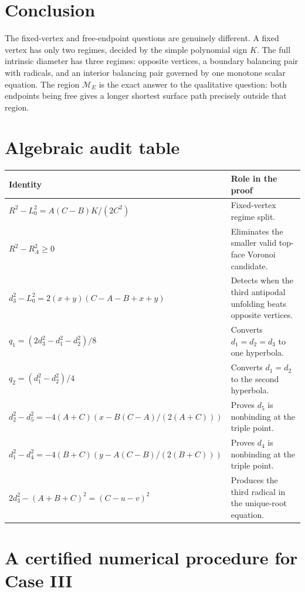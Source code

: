 \documentclass[11pt]{article}
\theoremstyle{definition}
\begin{document}
\section{Conclusion}

The fixed-vertex and free-endpoint questions are genuinely different.  A
fixed vertex has only two regimes, decided by the simple polynomial sign
$K$.  The full intrinsic diameter has three regimes: opposite vertices, a
boundary balancing pair with radicals, and an interior balancing pair governed
by one monotone scalar equation.  The region $\mathcal M_E$ is the exact
answer to the qualitative question: both endpoints being free gives a longer
shortest surface path precisely outside that region.

\appendix

\section{Algebraic audit table}

\begin{longtable}{>{\raggedright\arraybackslash}p{}
                  >{\raggedright\arraybackslash}p{}}
\toprule
Identity & Role in the proof\\
\midrule
\endhead
$R^2-L_0^2=A(C-B)K/(2C^2)$ & Fixed-vertex regime split.\\[2pt]
$R^2-R_A^2\ge0$ & Eliminates the smaller valid top-face Voronoi candidate.\\[2pt]
$d_3^2-L_0^2=2(x+y)(C-A-B+x+y)$ & Detects when the third antipodal unfolding beats opposite vertices.\\[2pt]
$q_1=(2d_3^2-d_1^2-d_2^2)/8$ & Converts $d_1=d_2=d_3$ to one hyperbola.\\[2pt]
$q_2=(d_1^2-d_2^2)/4$ & Converts $d_1=d_2$ to the second hyperbola.\\[2pt]
$d_2^2-d_5^2=-4(A+C)(x-B(C-A)/(2(A+C)))$ & Proves $d_5$ is nonbinding at the triple point.\\[2pt]
$d_1^2-d_4^2=-4(B+C)(y-A(C-B)/(2(B+C)))$ & Proves $d_4$ is nonbinding at the triple point.\\[2pt]
$2d_3^2-(A+B+C)^2=(C-u-v)^2$ & Produces the third radical in the unique-root equation.\\
\bottomrule
\end{longtable}

\section{A certified numerical procedure for Case III}
\end{document}

